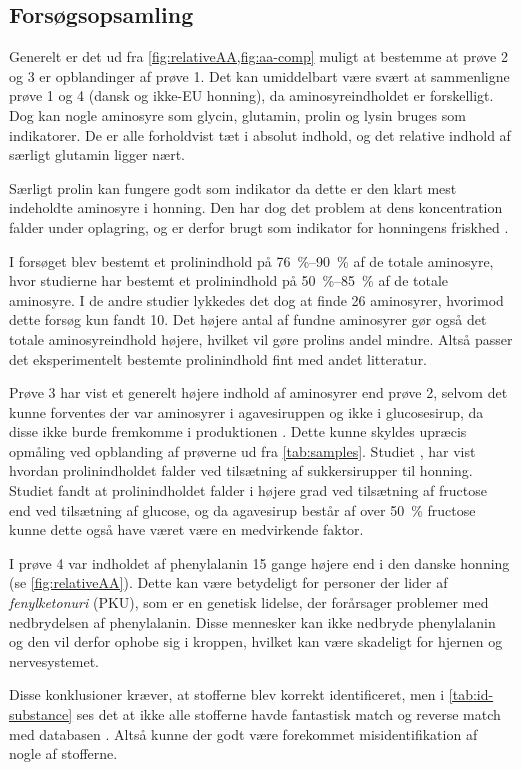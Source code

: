 \subsection{Forsøgsopsamling}
Generelt er det ud fra \cref{fig:relativeAA,fig:aa-comp} muligt at bestemme at prøve 2 og 3 er opblandinger af prøve 1.
Det kan umiddelbart være svært at sammenligne prøve 1 og 4 (dansk og ikke-EU honning), da aminosyreindholdet er forskelligt.
Dog kan nogle aminosyre som glycin, glutamin, prolin og lysin bruges som indikatorer.
De er alle forholdvist tæt i absolut indhold, og det relative indhold af særligt glutamin ligger nært.
\par Særligt prolin kan fungere godt som indikator da dette er den klart mest indeholdte aminosyre i honning.
Den har dog det problem at dens koncentration falder under oplagring, og er derfor brugt som indikator for honningens friskhed \parencite{VonDerOhe}.
\par I forsøget blev bestemt et prolinindhold på \qtyrange{76}{90}{\percent} af de totale aminosyre, hvor studierne \textcite{geohoney,aaPureHoney} har bestemt et prolinindhold på \qtyrange{50}{85}{\percent} af de totale aminosyre.
I de andre studier lykkedes det dog at finde \num{26} aminosyrer, hvorimod dette forsøg kun fandt \num{10}. Det højere antal af fundne aminosyrer gør også det totale aminosyreindhold højere, hvilket vil gøre prolins andel mindre.
Altså passer det eksperimentelt bestemte prolinindhold fint med andet litteratur.
\par Prøve 3 har vist et generelt højere indhold af aminosyrer end prøve 2, selvom det kunne forventes der var aminosyrer i agavesiruppen \parencite{agaveAA} og ikke i glucosesirup, da disse ikke burde fremkomme i produktionen \parencite{glucoseManufacture}.
Dette kunne skyldes upræcis opmåling ved opblanding af prøverne ud fra \cref{tab:samples}.
Studiet \textcite{prolineHoney}, har vist hvordan prolinindholdet falder ved tilsætning af sukkersirupper til honning.
Studiet fandt at prolinindholdet falder i højere grad ved tilsætning af fructose end ved tilsætning af glucose, og da agavesirup består af over \qty{50}{\percent} fructose \parencite{agaveSyrup} kunne dette også have været være en medvirkende faktor.
\par I prøve 4 var indholdet af phenylalanin \num{15} gange højere end i den danske honning (se \cref{fig:relativeAA}).
Dette kan være betydeligt for personer der lider af \emph{fenylketonuri} (PKU), som er en genetisk lidelse, der forårsager problemer med nedbrydelsen af phenylalanin.
Disse mennesker kan ikke nedbryde phenylalanin og den vil derfor ophobe sig i kroppen, hvilket kan være skadeligt for hjernen og nervesystemet. \parencite{PKU}
\par Disse konklusioner kræver, at stofferne blev korrekt identificeret, men i \cref{tab:id-substance} ses det at ikke alle stofferne havde fantastisk match og reverse match med databasen \textcite{nist23}.
Altså kunne der godt være forekommet misidentifikation af nogle af stofferne.
